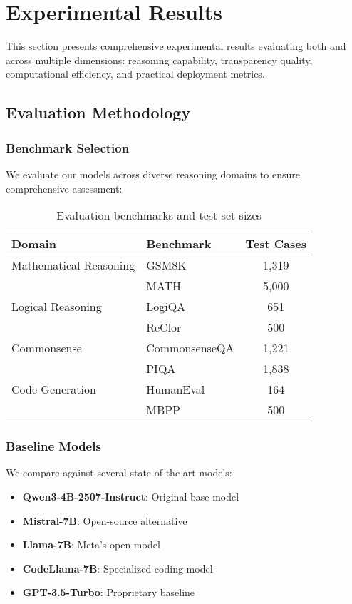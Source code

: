 \section{Experimental Results}
\label{sec:evaluation}

This section presents comprehensive experimental results evaluating both \supra{} and \zennano{} across multiple dimensions: reasoning capability, transparency quality, computational efficiency, and practical deployment metrics.

\subsection{Evaluation Methodology}

\subsubsection{Benchmark Selection}

We evaluate our models across diverse reasoning domains to ensure comprehensive assessment:

\begin{table}[H]
\centering
\begin{tabular}{llc}
\toprule
Domain & Benchmark & Test Cases \\
\midrule
Mathematical Reasoning & GSM8K & 1,319 \\
                       & MATH & 5,000 \\
Logical Reasoning & LogiQA & 651 \\
                  & ReClor & 500 \\
Commonsense & CommonsenseQA & 1,221 \\
            & PIQA & 1,838 \\
Code Generation & HumanEval & 164 \\
                & MBPP & 500 \\
\bottomrule
\end{tabular}
\caption{Evaluation benchmarks and test set sizes}
\label{tab:benchmarks}
\end{table}

\subsubsection{Baseline Models}

We compare against several state-of-the-art models:

\begin{itemize}
    \item \textbf{Qwen3-4B-2507-Instruct}: Original base model
    \item \textbf{Mistral-7B}: Open-source alternative
    \item \textbf{Llama-7B}: Meta's open model
    \item \textbf{CodeLlama-7B}: Specialized coding model
    \item \textbf{GPT-3.5-Turbo}: Proprietary baseline
\end{itemize}

